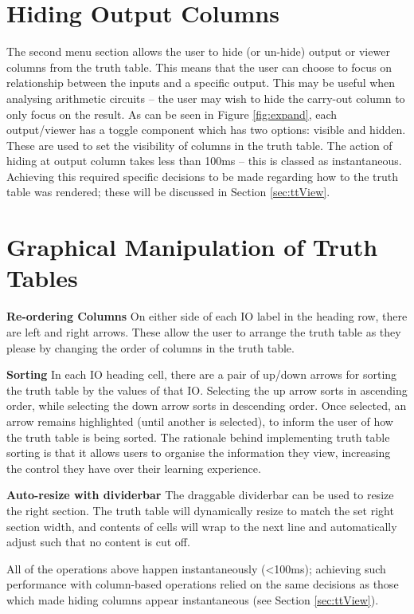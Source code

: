 \section{Hiding Output Columns}
The second menu section allows the user to hide (or un-hide) output or viewer columns from the truth table. This means that the user can choose to focus on relationship between the inputs and a specific output. This may be useful when analysing arithmetic circuits -- the user may wish to hide the carry-out column to only focus on the result. As can be seen in Figure \ref{fig:expand}, each output/viewer has a toggle component which has two options: visible and hidden. These are used to set the visibility of columns in the truth table. The action of hiding at output column takes less than 100ms -- this is classed as instantaneous. Achieving this required specific decisions to be made regarding how to the truth table was rendered; these will be discussed in Section \ref{sec:ttView}.

\section{Graphical Manipulation of Truth Tables}
\textbf{Re-ordering Columns} On either side of each IO label in the heading row, there are left and right arrows. These allow the user to arrange the truth table as they please by changing the order of columns in the truth table.

\textbf{Sorting} In each IO heading cell, there are a pair of up/down arrows for sorting the truth table by the values of that IO. Selecting the up arrow sorts in ascending order, while selecting the down arrow sorts in descending order. Once selected, an arrow remains highlighted (until another is selected), to inform the user of how the truth table is being sorted. The rationale behind implementing truth table sorting is that it allows users to organise the information they view, increasing the control they have over their learning experience. 

\textbf{Auto-resize with dividerbar} The draggable dividerbar can be used to resize the right section. The truth table will dynamically resize to match the set right section width, and contents of cells will wrap to the next line and automatically adjust such that no content is cut off.

All of the operations above happen instantaneously (<100ms); achieving such performance with column-based operations relied on the same decisions as those which made hiding columns appear instantaneous (see Section \ref{sec:ttView}).

